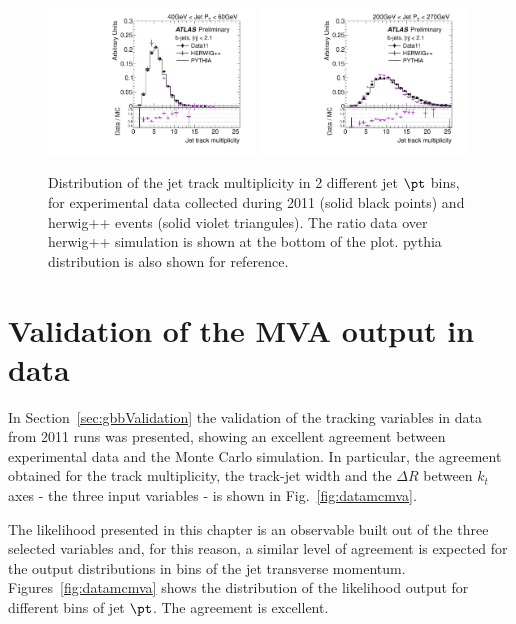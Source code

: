 \begin{figure}[tp]
\centering
\includegraphics[width=0.49\textwidth]{FIGS/systematics/DataVarNtrkPT040.pdf}
\includegraphics[width=0.49\textwidth]{FIGS/systematics/DataVarNtrkPT200.pdf}
\caption{Distribution of the jet track multiplicity in 2 different jet $\pt$ bins, for experimental data  collected during 2011 (solid black points) and {\sc herwig}++ events (solid violet triangules). The ratio data over {\sc herwig}++ simulation is shown at the bottom of the plot. {\sc pythia} distribution is also shown for reference.}
\label{fig:herwigdatamc}
\end{figure}



\section{Validation of the MVA output in data}\label{sec:MVAvalidation}

In Section~\ref{sec:gbbValidation} the validation of the tracking variables in data from 2011 runs was presented,  showing an excellent agreement between experimental data and the Monte Carlo simulation. In particular, the agreement obtained for the track multiplicity, the track-jet width and the $\Delta R$ between $k_t$ axes - the three input variables -  is shown in Fig.~\ref{fig:datamcmva}. 

The likelihood presented in this chapter is an observable built out of the three selected variables and, for this reason, a similar level of agreement is expected for the output distributions in bins of the jet transverse momentum.  Figures~\ref{fig:datamcmva} shows the distribution of the likelihood output for different bins of jet $\pt$. The agreement is excellent.


